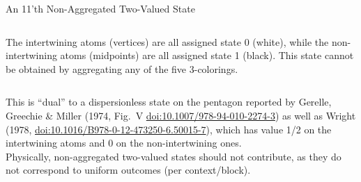 \documentclass{beamer}
\begin{document}
\begin{frame}[fragile]{An 11'th Non-Aggregated Two-Valued State}
\begin{columns}[c]
\begin{column}{0.70\textwidth}
                The \alert{intertwining} atoms (vertices) are all assigned state \alert{0} (white), while the non-intertwining atoms (midpoints) are all assigned state \alert{1} (black). This state cannot be obtained by aggregating any of the five 3-colorings.


        \end{column}
  \end{columns}
$\;$\\
$\;$\\
This is ``dual'' to a dispersionless state on the pentagon reported by Gerelle, Greechie \& Miller
(1974, Fig.~V \href{https://doi.org/10.1007/978-94-010-2274-3}{doi:10.1007/978-94-010-2274-3})
as well as Wright (1978, \href{https://doi.org/10.1016/B978-0-12-473250-6.50015-7}{doi:10.1016/B978-0-12-473250-6.50015-7}),
which has value 1/2 on the intertwining atoms and 0 on the non-intertwining ones.
$\;$\\
$\;$\\
\alert{Physically, non-aggregated two-valued states should not contribute},
as they \alert{do not correspond to uniform outcomes} (per context/block).
\end{frame}
\end{document}
